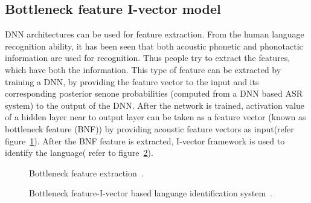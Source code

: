 \begin{spacing}{1.5}
\section{Bottleneck feature I-vector model}
DNN architectures can be used for feature extraction. From the human language recognition ability, it has been seen that both acoustic phonetic and phonotactic information are used for recognition. Thus people try to extract the features, which have both the information. This type of feature can be extracted by training a DNN, by providing the feature vector to the input and its corresponding posterior senone probabilities (computed from a DNN based ASR system) to the output of the DNN. After the network is trained, activation value of a hidden layer near to output layer can be taken as a feature vector (known as bottleneck feature (BNF)) by providing acoustic feature vectors as input(refer figure~\ref{bnf}). After the BNF feature is extracted, I-vector framework is used to identify the language( refer to figure~\ref{bnf1}).  
\begin{figure}[h]
\caption{Bottleneck feature extraction~\cite{zhang2018language}.}
\label{bnf}
\end{figure}
\begin{figure}[h]
\caption{Bottleneck feature-I-vector based language identification system~\cite{jiang2014deep}.}
\label{bnf1}
\end{figure}


\end{spacing}

